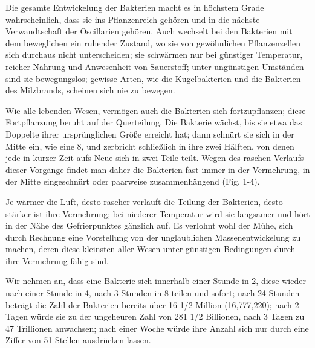 \documentclass[a4paper, 11pt, oneside, english]{article}
\begin{document}
Die gesamte Entwickelung der Bakterien macht es in höchstem Grade wahrscheinlich, dass sie ins Pflanzenreich gehören und in die nächste Verwandtschaft der Oscillarien gehören. Auch wechselt bei den Bakterien mit dem beweglichen ein ruhender Zustand, wo sie von gewöhnlichen Pflanzenzellen sich durchaus nicht unterscheiden; sie schwärmen nur bei günstiger Temperatur, reicher Nahrung und Anwesenheit von Sauerstoff; unter ungünstigen Umständen sind sie bewegungslos; gewisse Arten, wie die Kugelbakterien und die Bakterien des Milzbrands, scheinen sich nie zu bewegen.

Wie alle lebenden Wesen, vermögen auch die Bakterien sich fortzupflanzen; diese Fortpflanzung beruht auf der Querteilung. Die Bakterie wächst, bis sie etwa das Doppelte ihrer ursprünglichen Größe erreicht hat; dann schnürt sie sich in der Mitte ein, wie eine 8, und zerbricht schließlich in ihre zwei Hälften, von denen jede in kurzer Zeit aufs Neue sich in zwei Teile teilt. Wegen des raschen Verlaufs dieser Vorgänge findet man daher die Bakterien fast immer in der Vermehrung, in der Mitte eingeschnürt oder paarweise zusammenhängend (Fig. 1-4).

Je wärmer die Luft, desto rascher verläuft die Teilung der Bakterien, desto stärker ist ihre Vermehrung; bei niederer Temperatur wird sie langsamer und hört in der Nähe des Gefrierpunktes gänzlich auf. Es verlohnt wohl der Mühe, sich durch Rechnung eine Vorstellung von der unglaublichen Massenentwickelung zu machen, deren diese kleinsten aller Wesen unter günstigen Bedingungen durch ihre Vermehrung fähig sind.

Wir nehmen an, dass eine Bakterie sich innerhalb einer Stunde in 2, diese wieder nach einer Stunde in 4, nach 3 Stunden in 8 teilen und sofort; nach 24 Stunden beträgt die Zahl der Bakterien bereits über 16 1/2 Million (16,777,220); nach 2 Tagen würde sie zu der ungeheuren Zahl von 281 1/2 Billionen, nach 3 Tagen zu 47 Trillionen anwachsen; nach einer Woche würde ihre Anzahl sich nur durch eine Ziffer von 51 Stellen ausdrücken lassen.
\end{document}
